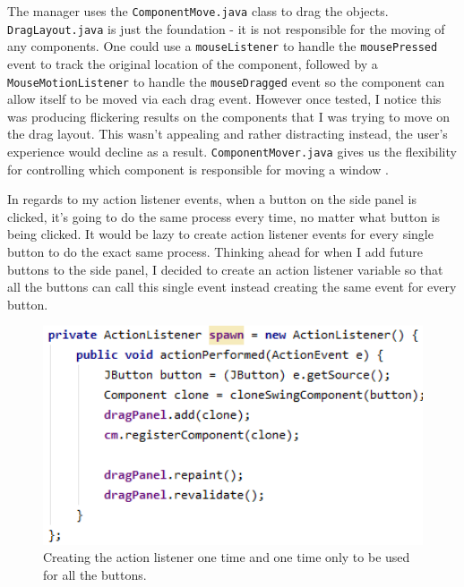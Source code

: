 \documentclass[a4paper, 12pt]{article}
\begin{document}
            The manager uses the \texttt{ComponentMove.java} class to drag the objects.
            \texttt{DragLayout.java} is just the foundation - it is not responsible for the moving
            of any components. One could use a \texttt{mouseListener} to handle the \texttt{mousePressed}
            event to track the original location of the component, followed by a \texttt{MouseMotionListener}
            to handle the \texttt{mouseDragged} event so the component can allow itself to be moved via
            each drag event. However once tested, I notice this was producing flickering results on the
            components that I was trying to move on the drag layout. This wasn't appealing and rather
            distracting instead, the user's experience would decline as a result. \texttt{ComponentMover.java}
            gives us the flexibility for controlling which component is responsible for moving a window
            \cite{componentMover}.

            \clearpage
            In regards to my action listener events, when a button on the side panel is clicked,
            it's going to do the same process every time, no matter what button is being
            clicked. It would be lazy to create action listener events for every single button
            to do the exact same process. Thinking ahead for when I add future buttons to the
            side panel, I decided to create an action listener variable so that all the buttons
            can call this single event instead creating the same event for every button. \\

            \begin{figure}[h]
                \centering
                \includegraphics[width=120mm]{actionlistener.png}
                \caption{Creating the action listener one time and one time only to be used for all
                the buttons.}
            \end{figure}
        
\end{document}
